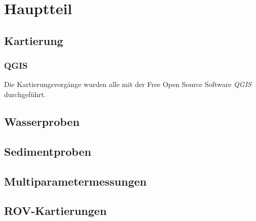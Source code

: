  

\chapter[Hauptteil]{Hauptteil}

\section{Kartierung}
    \subsection*{QGIS}
    Die Kartierungsvorgänge wurden alle mit der Free Open Source Software \emph{QGIS}\cite{qgis} durchgeführt.
    
\section{Wasserproben}
\section{Sedimentproben}
\section{Multiparametermessungen}
\section{ROV-Kartierungen}
